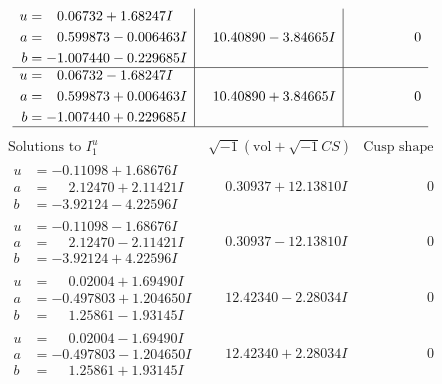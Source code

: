 \documentclass[1p]{elsarticle_modified}
\theoremstyle{definition}
\newcommand{\I}{\sqrt{-1}}
\begin{document}
$$\begin{array}{c|c|c}
\begin{aligned}
u &= \phantom{-}0.06732 + 1.68247 I \\
a &= \phantom{-}0.599873 - 0.006463 I \\
b &= -1.007440 - 0.229685 I\end{aligned}
 & \phantom{-}10.40890 - 3.84665 I & \phantom{-0.000000 } 0 \\ \hline\begin{aligned}
u &= \phantom{-}0.06732 - 1.68247 I \\
a &= \phantom{-}0.599873 + 0.006463 I \\
b &= -1.007440 + 0.229685 I\end{aligned}
 & \phantom{-}10.40890 + 3.84665 I & \phantom{-0.000000 } 0\\
 \hline 
 \end{array}$$\newpage$$\begin{array}{c|c|c}  
\text{Solutions to }I^u_{1}& \I (\text{vol} + \sqrt{-1}CS) & \text{Cusp shape}\\
 \hline 
\begin{aligned}
u &= -0.11098 + 1.68676 I \\
a &= \phantom{-}2.12470 + 2.11421 I \\
b &= -3.92124 - 4.22596 I\end{aligned}
 & \phantom{-}0.30937 + 12.13810 I & \phantom{-0.000000 } 0 \\ \hline\begin{aligned}
u &= -0.11098 - 1.68676 I \\
a &= \phantom{-}2.12470 - 2.11421 I \\
b &= -3.92124 + 4.22596 I\end{aligned}
 & \phantom{-}0.30937 - 12.13810 I & \phantom{-0.000000 } 0 \\ \hline\begin{aligned}
u &= \phantom{-}0.02004 + 1.69490 I \\
a &= -0.497803 + 1.204650 I \\
b &= \phantom{-}1.25861 - 1.93145 I\end{aligned}
 & \phantom{-}12.42340 - 2.28034 I & \phantom{-0.000000 } 0 \\ \hline\begin{aligned}
u &= \phantom{-}0.02004 - 1.69490 I \\
a &= -0.497803 - 1.204650 I \\
b &= \phantom{-}1.25861 + 1.93145 I\end{aligned}
 & \phantom{-}12.42340 + 2.28034 I & \phantom{-0.000000 } 0 \\ \hline\begin{aligned}

\end{aligned}
\end{array}$$
\end{document}

